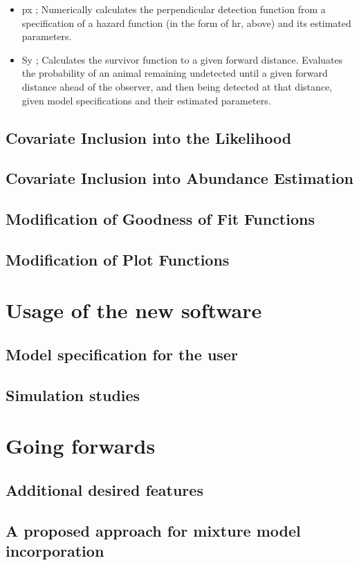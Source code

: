 \documentclass[11pt]{article}
\begin{document}
\begin{multicols}{2}
\begin{itemize}
\item px ; Numerically calculates the perpendicular detection function from a specification of a hazard function (in the form of hr, above) and its estimated parameters.

\item Sy ; Calculates the survivor function to a given forward distance. Evaluates the probability of an animal remaining undetected until a given forward distance ahead of the observer, and then being detected at that distance, given model specifications and their estimated parameters.
\end{itemize}

\subsection{Covariate Inclusion into the Likelihood}
\subsection{Covariate Inclusion into Abundance Estimation}
\subsection{Modification of Goodness of Fit Functions}
\subsection{Modification of Plot Functions}
\section{Usage of the new software}
\subsection{Model specification for the user}
\subsection{Simulation studies}

\section{Going forwards}
\subsection{Additional desired features}
\subsection{A proposed approach for mixture model incorporation}




\end{multicols}
\end{document}

